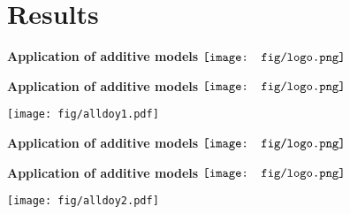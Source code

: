 \documentclass{beamer}
\begin{document}
\section{Results}

\begin{frame}{\textbf{Application of additive models} \hspace{0pt plus 1 filll} $\vcenter{\hbox{\texttt{[image: fig/logo.png]}}}$}
\vspace{-0.2in}
\begin{center}
\end{center}
\end{frame}

\begin{frame}{\textbf{Application of additive models} \hspace{0pt plus 1 filll} $\vcenter{\hbox{\texttt{[image: fig/logo.png]}}}$}
\vspace{-0.15in}
\begin{center}
\texttt{[image: fig/alldoy1.pdf]}
\end{center}
\end{frame}

\begin{frame}{\textbf{Application of additive models} \hspace{0pt plus 1 filll} $\vcenter{\hbox{\texttt{[image: fig/logo.png]}}}$}
\vspace{-0.2in}
\begin{center}
\end{center}
\end{frame}

\begin{frame}{\textbf{Application of additive models} \hspace{0pt plus 1 filll} $\vcenter{\hbox{\texttt{[image: fig/logo.png]}}}$}
\vspace{-0.15in}
\begin{center}
\texttt{[image: fig/alldoy2.pdf]}
\end{center}
\end{frame}
\end{document}

